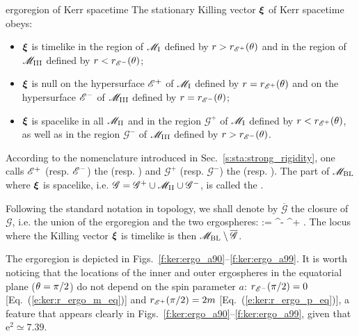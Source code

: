 \begin{tprop}{ergoregion of Kerr spacetime}{}
The stationary Killing vector $\bm{\xi}$ of Kerr spacetime obeys:
\begin{itemize}
\item $\bm{\xi}$ is timelike in the region of $\mathscr{M}_{\rm I}$ defined by $r>r_{\mathscr{E}^+}(\theta)$
and in the region of $\mathscr{M}_{\rm III}$ defined by $r<r_{\mathscr{E}^-}(\theta)$;
\item $\bm{\xi}$ is null on the hypersurface $\mathscr{E}^+$ of $\mathscr{M}_{\rm I}$ defined by
$r=r_{\mathscr{E}^+}(\theta)$
and on the hypersurface $\mathscr{E}^-$ of $\mathscr{M}_{\rm III}$ defined by $r=r_{\mathscr{E}^-}(\theta)$;
\item $\bm{\xi}$ is spacelike in all $\mathscr{M}_{\rm II}$ and in the region
$\mathscr{G}^+$ of $\mathscr{M}_{\rm I}$
defined by $r<r_{\mathscr{E}^+}(\theta)$, as well as
in the region $\mathscr{G}^-$ of $\mathscr{M}_{\rm III}$ defined by $r>r_{\mathscr{E}^-}(\theta)$.
\end{itemize}
According to the nomenclature introduced in Sec.~\ref{s:sta:strong_rigidity},
one calls $\mathscr{E}^+$ (resp. $\mathscr{E}^-$) the
(resp. )
and $\mathscr{G}^+$ (resp. $\mathscr{G}^-$) the
(resp. ).
The part of $\mathscr{M}_{\rm BL}$ where $\bm{\xi}$ is spacelike, i.e.
$\mathscr{G} = \mathscr{G}^+ \cup \mathscr{M}_{\rm II} \cup \mathscr{G}^-$,
is called the .
\end{tprop}


Following the standard notation in topology, we shall denote
by $\overline{\mathscr{G}}$ the closure of $\mathscr{G}$, i.e. the
union of the ergoregion and the two ergospheres:
\be
     :=  \cup \E^- \cup \E^+ .
\ee
The locus where the Killing vector $\bm{\xi}$ is timelike is then
$\mathscr{M}_{\rm BL}\setminus \overline{\mathscr{G}}$.

The ergoregion is depicted in Figs.~\ref{f:ker:ergo_a90}--\ref{f:ker:ergo_a99}.
It is worth noticing that
the locations of the inner and outer ergospheres in the equatorial
plane ($\theta=\pi/2$) do not depend on the spin parameter $a$:
$r_{\mathscr{E}^-}(\pi/2) = 0$ [Eq.~(\ref{e:ker:r_ergo_m_eq})] and
$r_{\mathscr{E}^+}(\pi/2) = 2m$ [Eq.~(\ref{e:ker:r_ergo_p_eq})], a feature
that appears clearly in Figs.~\ref{f:ker:ergo_a90}--\ref{f:ker:ergo_a99},
given that $\mathrm{e}^2 \simeq 7.39$.

